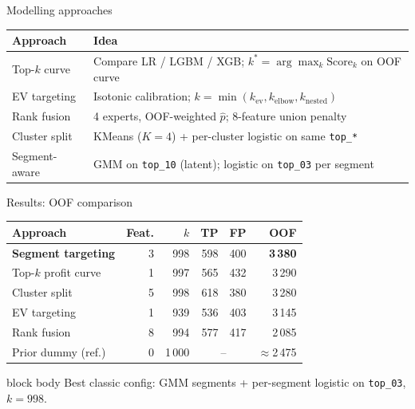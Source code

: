 \documentclass[aspectratio=169]{beamer}
\newcommand{\slidecomment}[1]{
    \vspace{0.3em}
    \begin{beamercolorbox}[wd=\linewidth,rounded=true,sep=0.7ex]{block body}
        \small #1
    \end{beamercolorbox}
}
\begin{document}
\begin{frame}{Modelling approaches}
    \small
    \begin{table}
        \begin{tabular}{p{}p{}}
            \toprule
            \textbf{Approach} & \textbf{Idea} \\
            \midrule
            Top-$k$ curve &
            Compare LR / LGBM / XGB; $k^* = \arg\max_k \mathrm{Score}_k$ on OOF curve \\
            EV targeting &
            Isotonic calibration; $k = \min(k_{\mathrm{ev}}, k_{\mathrm{elbow}}, k_{\mathrm{nested}})$ \\
            Rank fusion &
            4 experts, OOF-weighted $\hat{p}$; 8-feature union penalty \\
            Cluster split &
            KMeans ($K{=}4$) + per-cluster logistic on same \texttt{top\_*} \\
            Segment-aware &
            GMM on \texttt{top\_10} (latent); logistic on \texttt{top\_03} per segment \\
            \bottomrule
        \end{tabular}
    \end{table}
\end{frame}

\begin{frame}{Results: OOF comparison}
    \footnotesize
    \begin{table}
        \begin{tabular}{lrrrrr}
            \toprule
            Approach & Feat. & $k$ & TP & FP & OOF \\
            \midrule
            \textbf{Segment targeting} & 3 & 998 & 598 & 400 & \textbf{3\,380} \\
            Top-$k$ profit curve & 1 & 997 & 565 & 432 & 3\,290 \\
            Cluster split & 5 & 998 & 618 & 380 & 3\,280 \\
            EV targeting & 1 & 939 & 536 & 403 & 3\,145 \\
            Rank fusion & 8 & 994 & 577 & 417 & 2\,085 \\
            \midrule
            Prior dummy (ref.) & 0 & 1\,000 & \multicolumn{2}{c}{--} & $\approx$2\,475 \\
            \bottomrule
        \end{tabular}
    \end{table}

    \slidecomment{Best classic config: GMM segments + per-segment logistic on \texttt{top\_03}, $k{=}998$.}
\end{frame}
\end{document}
